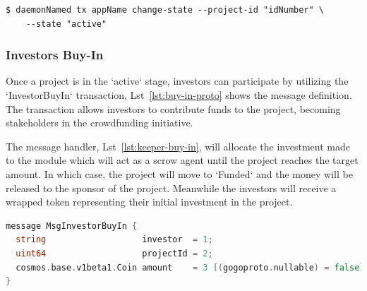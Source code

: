 \begin{verbatim}
$ daemonNamed tx appName change-state --project-id "idNumber" \
    --state "active"
\end{verbatim}

\subsubsection{Investors Buy-In}
Once a project is in the `active` stage, investors can participate by utilizing the `InvestorBuyIn` transaction, Lst~\ref{lst:buy-in-proto} shows the message definition. The transaction allows investors to contribute funds to the project, becoming stakeholders in the crowdfunding initiative.

The message handler, Lst~\ref{lst:keeper-buy-in}, will allocate the investment made to the module which will act as a scrow agent until the project reaches the target amount. In which case, the project will move to `Funded` and the money will be released to the sponsor of the project. Meanwhile the investors will receive a wrapped token representing their initial investment in the project.

\newpage
\begin{lstlisting}[language=go, caption=InvestorbuyIn protobuf definition,label={lst:buy-in-proto}]
message MsgInvestorBuyIn {
  string                   investor  = 1;
  uint64                   projectId = 2;
  cosmos.base.v1beta1.Coin amount    = 3 [(gogoproto.nullable) = false];
}
\end{lstlisting}

